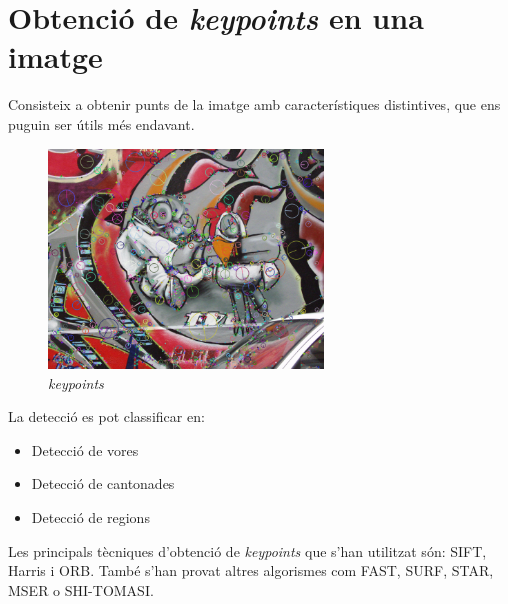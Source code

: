 \section{Obtenció de \textit{keypoints} en una imatge}
	Consisteix a obtenir punts de la imatge amb característiques distintives, que ens puguin ser útils més endavant.\\
	\begin{figure}[H]
		\centering
		\includegraphics[width=0.65\textwidth]{images/RobotKp}
		\caption{\textit{keypoints}}
	\end{figure}
	\noindent
	La detecció es pot classificar en:\\
	\begin{itemize}
		\item{Detecció de vores}
		\item{Detecció de cantonades}
		\item{Detecció de regions\\}
	\end{itemize}
	Les principals tècniques d'obtenció de \textit{keypoints} que s'han utilitzat són: SIFT, Harris i ORB.
	També s'han provat altres algorismes com FAST, SURF, STAR, MSER o SHI-TOMASI.

